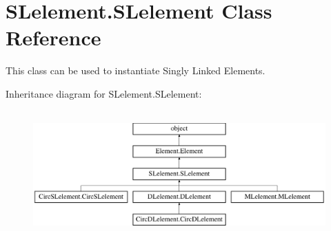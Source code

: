 \hypertarget{class_s_lelement_1_1_s_lelement}{}\section{S\+Lelement.\+S\+Lelement Class Reference}
\label{class_s_lelement_1_1_s_lelement}


This class can be used to instantiate Singly Linked Elements.  


Inheritance diagram for S\+Lelement.\+S\+Lelement\+:\begin{figure}[H]
\begin{center}
\leavevmode
\includegraphics[height=4.912281cm]{class_s_lelement_1_1_s_lelement}
\end{center}
\end{figure}
